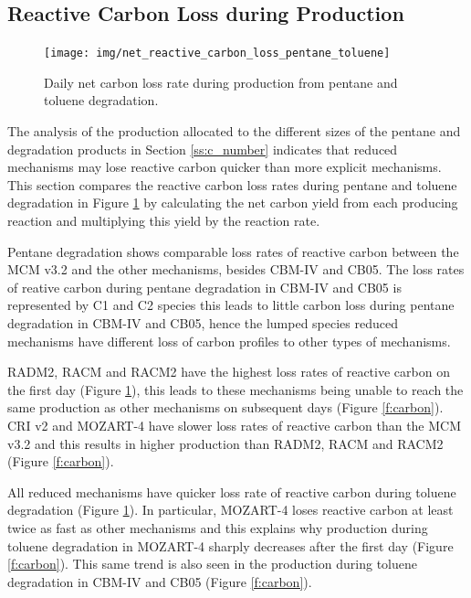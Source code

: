 \subsection[Reactive Carbon Loss during Ox Production]{Reactive Carbon Loss during  Production} \label{ss:carbon_loss}

\begin{figure}
    \centering
    \texttt{[image: img/net\_reactive\_carbon\_loss\_pentane\_toluene]}
    \vspace{0mm}
    \caption{Daily net carbon loss rate during  production from pentane and toluene degradation.}
    \vspace{-4mm}
    \label{f:net_carbon_loss}
\end{figure}

The analysis of the  production allocated to the different sizes of the pentane and degradation products in Section \ref{ss:c_number} indicates that reduced mechanisms may lose reactive carbon quicker than more explicit mechanisms.
This section compares the reactive carbon loss rates during pentane and toluene degradation in Figure \ref{f:net_carbon_loss} by calculating the net carbon yield from each  producing reaction and multiplying this yield by the reaction rate.

Pentane degradation shows comparable loss rates of reactive carbon between the MCM v3.2 and the other mechanisms, besides CBM-IV and CB05.
The loss rates of reative carbon during pentane degradation in CBM-IV and CB05 is represented by C1 and C2 species this leads to little carbon loss during pentane degradation in CBM-IV and CB05, hence the lumped species reduced mechanisms have different loss of carbon profiles to other types of mechanisms.

RADM2, RACM and RACM2 have the highest loss rates of reactive carbon on the first day (Figure \ref{f:net_carbon_loss}), this leads to these mechanisms being unable to reach the same  production as other mechanisms on subsequent days (Figure \ref{f:carbon}).
CRI v2 and MOZART-4 have slower loss rates of reactive carbon than the MCM v3.2 and this results in higher  production than RADM2, RACM and RACM2 (Figure \ref{f:carbon}).

All reduced mechanisms have quicker loss rate of reactive carbon during toluene degradation (Figure \ref{f:net_carbon_loss}).
In particular, MOZART-4 loses reactive carbon at least twice as fast as other mechanisms and this explains why  production during toluene degradation in MOZART-4 sharply decreases after the first day (Figure \ref{f:carbon}).
This same trend is also seen in the  production during toluene degradation in CBM-IV and CB05 (Figure \ref{f:carbon}).

